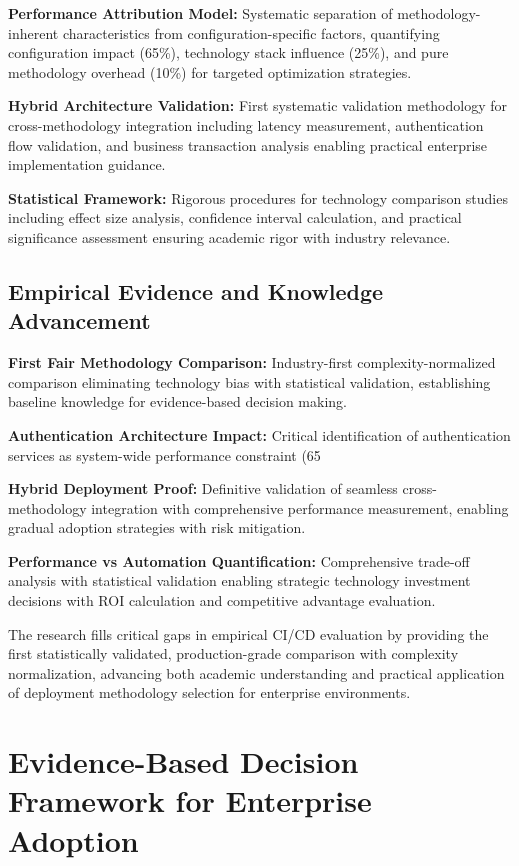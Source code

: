 \textbf{Performance Attribution Model:} Systematic separation of methodology-inherent characteristics from configuration-specific factors, quantifying configuration impact (65\%), technology stack influence (25\%), and pure methodology overhead (10\%) for targeted optimization strategies.

\textbf{Hybrid Architecture Validation:} First systematic validation methodology for cross-methodology integration including latency measurement, authentication flow validation, and business transaction analysis enabling practical enterprise implementation guidance.

\textbf{Statistical Framework:} Rigorous procedures for technology comparison studies including effect size analysis, confidence interval calculation, and practical significance assessment ensuring academic rigor with industry relevance.

\subsection{Empirical Evidence and Knowledge Advancement}
\label{subsec:empirical_evidence}

\textbf{First Fair Methodology Comparison:} Industry-first complexity-normalized comparison eliminating technology bias with statistical validation, establishing baseline knowledge for evidence-based decision making.

\textbf{Authentication Architecture Impact:} Critical identification of authentication services as system-wide performance constraint (65%

\textbf{Hybrid Deployment Proof:} Definitive validation of seamless cross-methodology integration with comprehensive performance measurement, enabling gradual adoption strategies with risk mitigation.

\textbf{Performance vs Automation Quantification:} Comprehensive trade-off analysis with statistical validation enabling strategic technology investment decisions with ROI calculation and competitive advantage evaluation.

The research fills critical gaps in empirical CI/CD evaluation by providing the first statistically validated, production-grade comparison with complexity normalization, advancing both academic understanding and practical application of deployment methodology selection for enterprise environments.

\section{Evidence-Based Decision Framework for Enterprise Adoption}
\label{sec:decision_framework}

